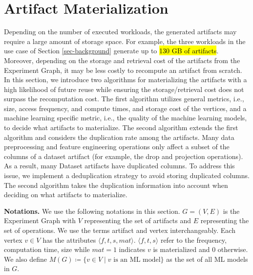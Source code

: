 \section{Artifact Materialization}\label{sec-materialization}
Depending on the number of executed workloads, the generated artifacts may require a large amount of storage space.
For example, the three workloads in the use case of Section \ref{sec-background} generate up to \hl{130 GB of artifacts}.
Moreover, depending on the storage and retrieval cost of the artifacts from the Experiment Graph, it may be less costly to recompute an artifact from scratch.
In this section, we introduce two algorithms for materializing the artifacts with a high likelihood of future reuse while ensuring the storage/retrieval cost does not surpass the recomputation cost.
The first algorithm utilizes general metrics, i.e., size, access frequency, and compute times, and storage cost of the vertices, and a machine learning specific metric, i.e., the quality of the machine learning models, to decide what artifacts to materialize.
The second algorithm extends the first algorithm and considers the duplication rate among the artifacts.
Many data preprocessing and feature engineering operations only affect a subset of the columns of a dataset artifact (for example, the drop and projection operations).
As a result, many Dataset artifacts have duplicated columns.
To address this issue, we implement a deduplication strategy to avoid storing duplicated columns.
The second algorithm takes the duplication information into account when deciding on what artifacts to materialize.

\textbf{Notations. }
We use the following notations in this section.
$G = (V,E)$ is the Experiment Graph with $V$ representing the set of artifacts and $E$ representing the set of operations.
We use the terms artifact and vertex interchangeably.
Each vertex $v \in V$ has the attributes $\langle f, t, s, mat \rangle$.
$\langle f, t, s \rangle$ refer to the frequency, computation time, size while $mat=1$ indicates $v$ is materialized and $0$ otherwise.
We also define $ M(G) \coloneqq  \{v \in V \mid v \text{ is an ML model}\}$ as the set of all ML models in $G$.

